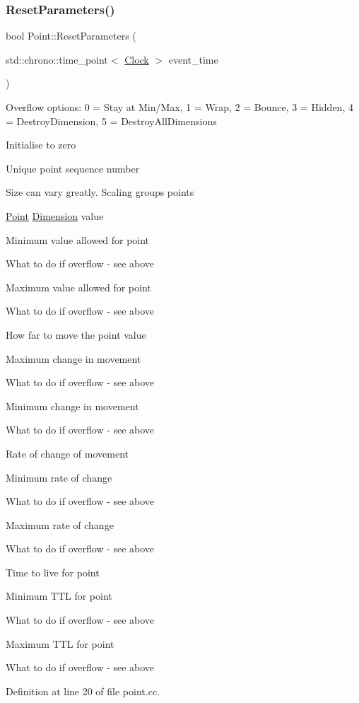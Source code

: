 \subsubsection{\texorpdfstring{Reset\+Parameters()}{ResetParameters()}}
{\footnotesize\ttfamily bool Point\+::\+Reset\+Parameters (\begin{DoxyParamCaption}\item[{std\+::chrono\+::time\+\_\+point$<$ \hyperlink{universe_8h_a0ef8d951d1ca5ab3cfaf7ab4c7a6fd80}{Clock} $>$}]{event\+\_\+time }\end{DoxyParamCaption})}

Overflow options\+: 0 = Stay at Min/\+Max, 1 = Wrap, 2 = Bounce, 3 = Hidden, 4 = Destroy\+Dimension, 5 = Destroy\+All\+Dimensions

Initialise to zero

Unique point sequence number

Size can vary greatly. Scaling groups points

\hyperlink{class_point}{Point} \hyperlink{class_dimension}{Dimension} value

Minimum value allowed for point

What to do if overflow -\/ see above

Maximum value allowed for point

What to do if overflow -\/ see above

How far to move the point value

Maximum change in movement

What to do if overflow -\/ see above

Minimum change in movement

What to do if overflow -\/ see above

Rate of change of movement

Minimum rate of change

What to do if overflow -\/ see above

Maximum rate of change

What to do if overflow -\/ see above

Time to live for point

Minimum T\+TL for point

What to do if overflow -\/ see above

Maximum T\+TL for point

What to do if overflow -\/ see above 

Definition at line 20 of file point.\+cc.

